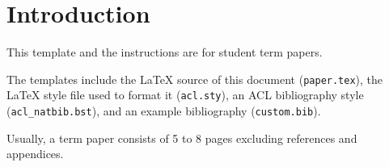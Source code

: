 \section{Introduction}

This template and the instructions are for student term papers.

The templates include the \LaTeX{} source of this document (\texttt{paper.tex}),
the \LaTeX{} style file used to format it (\texttt{acl.sty}),
an ACL bibliography style (\texttt{acl\_natbib.bst}),
and an example bibliography (\texttt{custom.bib}).

Usually, a term paper consists of 5 to 8 pages excluding references and appendices.